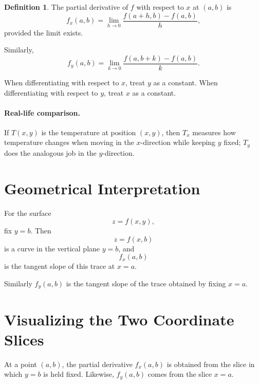 \documentclass[11pt,oneside]{book}
\theoremstyle{studentthm}
\theoremstyle{definition}
\newtheorem{definition}[theorem]{Definition}
\begin{document}
\begin{definition}
The partial derivative of \(f\) with respect to \(x\) at \((a,b)\) is
\[
f_x(a,b)
=
\lim_{h\to0}
\frac{f(a+h,b)-f(a,b)}{h},
\]
provided the limit exists.
\end{definition}

Similarly,
\[
f_y(a,b)
=
\lim_{k\to0}
\frac{f(a,b+k)-f(a,b)}{k}.
\]

When differentiating with respect to \(x\), treat \(y\) as a constant.
When differentiating with respect to \(y\), treat \(x\) as a constant.

\paragraph{Real-life comparison.}
If \(T(x,y)\) is the temperature at position \((x,y)\), then \(T_x\)
measures how temperature changes when moving in the \(x\)-direction
while keeping \(y\) fixed; \(T_y\) does the analogous job in the
\(y\)-direction.

\section{Geometrical Interpretation}

For the surface
\[
z=f(x,y),
\]
fix \(y=b\). Then
\[
z=f(x,b)
\]
is a curve in the vertical plane \(y=b\), and
\[
f_x(a,b)
\]
is the tangent slope of this trace at \(x=a\).

Similarly \(f_y(a,b)\) is the tangent slope of the trace obtained by
fixing \(x=a\).


\section{Visualizing the Two Coordinate Slices}

At a point \((a,b)\), the partial derivative \(f_x(a,b)\) is obtained
from the slice in which \(y=b\) is held fixed. Likewise,
\(f_y(a,b)\) comes from the slice \(x=a\).

\begin{center}
\end{center}
\end{document}
